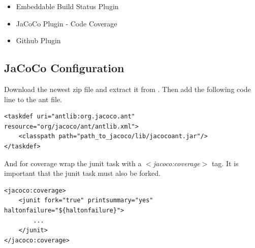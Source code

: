 \documentclass[11pt, a4paper]{article}
\begin{document}
\begin{itemize}
\item Embeddable Build Status Plugin
\item JaCoCo Plugin - Code Coverage
\item Github Plugin
\end{itemize}

\subsection{JaCoCo Configuration}

Download the newest zip file and extract it from \cite{jacoco:download}. Then add the following code line to the ant file.

\begin{lstlisting}
<taskdef uri="antlib:org.jacoco.ant" resource="org/jacoco/ant/antlib.xml">
	<classpath path="path_to_jacoco/lib/jacocoant.jar"/>
</taskdef>	   
\end{lstlisting}


And for coverage wrap the junit task with a \textit{$<$jacoco:coverage$>$} tag. It is important that the junit task must also be forked. 
\begin{lstlisting}
<jacoco:coverage>
	<junit fork="true" printsummary="yes" haltonfailure="${haltonfailure}">
		...
	</junit>
</jacoco:coverage>
\end{lstlisting}

\nocite{*}

{}
\end{document}
